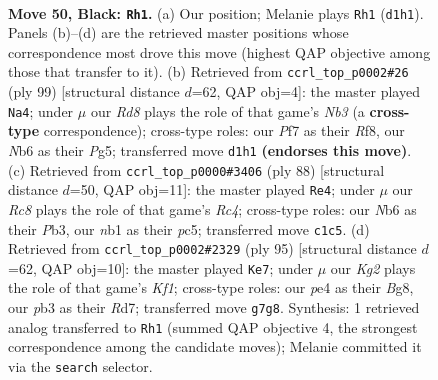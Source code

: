 \documentclass[11pt]{article}
\begin{document}
\clearpage

\begin{figure}[p]\centering
\begin{subfigure}{0.46\textwidth}\centering
\resizebox{\linewidth}{!}{%
\newchessgame
\chessboard[
  setfen={8/5pkp/1n4p1/p3p1P1/P3P3/1P4RP/5KP1/RNrr4 b - - 15 50},
  showmover=false,
  pgfstyle=straightmove, color=movearrow, markmove={d1-h1}
]}
\caption{}
\end{subfigure}\hfill
\begin{subfigure}{0.46\textwidth}\centering
\resizebox{\linewidth}{!}{%
\newchessgame
\chessboard[
  setfen={r4r2/4kp2/1n1p3p/3PpPp1/1Pp3P1/P1N4P/6K1/R2R4 b - - 3 50},
  showmover=false,
  pgfstyle=straightmove, color=movearrow, markmove={b6-a4}
]}
\caption{}
\end{subfigure}
\\[4pt]
\begin{subfigure}{0.46\textwidth}\centering
\resizebox{\linewidth}{!}{%
\newchessgame
\chessboard[
  setfen={8/p1r1kp2/4p2p/2p2r2/2R2PKP/PP1R4/2P5/8 w - - 7 45},
  showmover=false,
  pgfstyle=straightmove, color=movearrow, markmove={c4-e4}
]}
\caption{}
\end{subfigure}\hfill
\begin{subfigure}{0.46\textwidth}\centering
\resizebox{\linewidth}{!}{%
\newchessgame
\chessboard[
  setfen={5kb1/3r1p2/pp1p2p1/2r4p/2PR1P1P/KP1R4/P5B1/8 b - - 23 48},
  showmover=false,
  pgfstyle=straightmove, color=movearrow, markmove={f8-e7}
]}
\caption{}
\end{subfigure}
\caption{\textbf{Move 50, Black: \texttt{Rh1}.} (a) Our position; Melanie plays \texttt{Rh1} (\texttt{d1h1}). Panels (b)--(d) are the retrieved master positions whose correspondence most drove this move (highest QAP objective among those that transfer to it). (b) Retrieved from \texttt{ccrl\_top\_p0002\#26} (ply 99) [structural distance $d$=62, QAP obj=4]: the master played \texttt{Na4}; under $\mu$ our \emph{Rd8} plays the role of that game's \emph{Nb3} (a \textbf{cross-type} correspondence); cross-type roles: our \emph{P}f7 as their \emph{R}f8, our \emph{N}b6 as their \emph{P}g5; transferred move \texttt{d1h1} \textbf{(endorses this move)}. (c) Retrieved from \texttt{ccrl\_top\_p0000\#3406} (ply 88) [structural distance $d$=50, QAP obj=11]: the master played \texttt{Re4}; under $\mu$ our \emph{Rc8} plays the role of that game's \emph{Rc4}; cross-type roles: our \emph{N}b6 as their \emph{P}b3, our \emph{n}b1 as their \emph{p}c5; transferred move \texttt{c1c5}. (d) Retrieved from \texttt{ccrl\_top\_p0002\#2329} (ply 95) [structural distance $d$=62, QAP obj=10]: the master played \texttt{Ke7}; under $\mu$ our \emph{Kg2} plays the role of that game's \emph{Kf1}; cross-type roles: our \emph{p}e4 as their \emph{B}g8, our \emph{p}b3 as their \emph{R}d7; transferred move \texttt{g7g8}. Synthesis: 1 retrieved analog transferred to \texttt{Rh1} (summed QAP objective 4, the strongest correspondence among the candidate moves); Melanie committed it via the \texttt{search} selector.}
\label{fig:thought-m99}
\end{figure}
\end{document}
